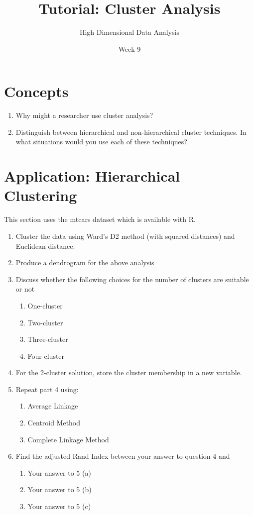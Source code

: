 \documentclass{article}
\title{Tutorial: Cluster Analysis}
\author{High Dimensional Data Analysis}
\date{Week 9}
\begin{document}
\maketitle
\section*{Concepts}
\begin{enumerate}
  \item Why might a researcher use cluster analysis?
  \item Distinguish between hierarchical and non-hierarchical cluster techniques. In what situations would you use each of these techniques?
\end{enumerate}
\section*{Application: Hierarchical Clustering}

This section uses the mtcars dataset which is available with R.
\begin{enumerate}
	\item Cluster the data using Ward's D2 method (with squared distances) and Euclidean distance.
	\item Produce a dendrogram for the above analysis
	\item Discuss whether the following choices for the number of clusters are suitable	or not
	\begin{enumerate}
		\item One-cluster
		\item Two-cluster
		\item Three-cluster
		\item Four-cluster
	\end{enumerate}

	\item  For the 2-cluster solution, store the cluster membership in a new variable.
	\item  Repeat part 4 using:
	\begin{enumerate}
		\item Average Linkage
		\item Centroid Method
		\item Complete Linkage Method
	\end{enumerate}

	\item Find the adjusted Rand Index between your answer to question 4 and
	\begin{enumerate}
		\item Your answer to 5 (a)
		\item Your answer to 5 (b)
		\item Your answer to 5 (c)
	\end{enumerate}
\end{enumerate}
\end{document}
